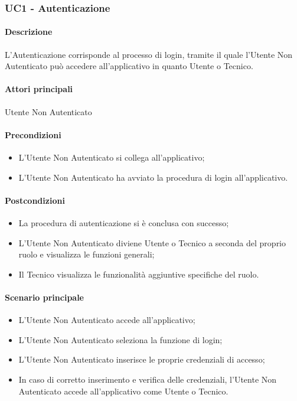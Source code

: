 \subsubsection{UC1 - Autenticazione}\label{UC1}
\paragraph*{Descrizione} L’Autenticazione corrisponde al processo di login, tramite il quale l’Utente Non Autenticato può accedere all’applicativo in quanto Utente o Tecnico.

\paragraph*{Attori principali} Utente Non Autenticato

\paragraph*{Precondizioni}
\begin{itemize}
  \item L’Utente Non Autenticato si collega all’applicativo;
  \item L’Utente Non Autenticato ha avviato la procedura di login all’applicativo.  
\end{itemize}

\paragraph*{Postcondizioni}
\begin{itemize}
  \item La procedura di autenticazione si è conclusa con successo;
  \item L’Utente Non Autenticato diviene Utente o Tecnico a seconda del proprio ruolo e visualizza le funzioni generali;
  \item Il Tecnico visualizza le funzionalità aggiuntive specifiche del ruolo.  
\end{itemize}

\paragraph*{Scenario principale}
\begin{itemize}
  \item L’Utente Non Autenticato accede all’applicativo;
  \item L’Utente Non Autenticato seleziona la funzione di login;
  \item L’Utente Non Autenticato inserisce le proprie credenziali di accesso;
  \item In caso di corretto inserimento e verifica delle credenziali, l’Utente Non Autenticato accede all’applicativo come Utente o Tecnico.
  
\end{itemize}

